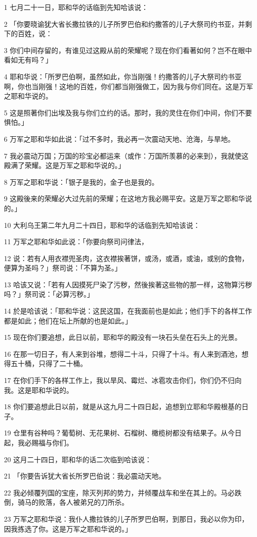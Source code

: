 \par 1 七月二十一日，耶和华的话临到先知哈该说：
\par 2 「你要晓谕犹大省长撒拉铁的儿子所罗巴伯和约撒答的儿子大祭司约书亚，并剩下的百姓，说：
\par 3 你们中间存留的，有谁见过这殿从前的荣耀呢？现在你们看著如何？岂不在眼中看如无有吗？」
\par 4 耶和华说：「所罗巴伯啊，虽然如此，你当刚强！约撒答的儿子大祭司约书亚啊，你也当刚强！这地的百姓，你们都当刚强做工，因为我与你们同在。这是万军之耶和华说的。
\par 5 这是照著你们出埃及我与你们立约的话。那时，我的灵住在你们中间，你们不要惧怕。」
\par 6 万军之耶和华如此说：「过不多时，我必再一次震动天地、沧海，与旱地。
\par 7 我必震动万国；万国的珍宝必都运来（或作：万国所羡慕的必来到），我就使这殿满了荣耀。这是万军之耶和华说的。」
\par 8 万军之耶和华说：「银子是我的，金子也是我的。
\par 9 这殿後来的荣耀必大过先前的荣耀；在这地方我必赐平安。这是万军之耶和华说的。」
\par 10 大利乌王第二年九月二十四日，耶和华的话临到先知哈该说：
\par 11 万军之耶和华如此说：「你要向祭司问律法，
\par 12 说：若有人用衣襟兜圣肉，这衣襟挨著饼，或汤，或酒，或油，或别的食物，便算为圣吗？」祭司说：「不算为圣。」
\par 13 哈该又说：「若有人因摸死尸染了污秽，然後挨著这些物的那一样，这物算污秽吗？」祭司说：「必算污秽。」
\par 14 於是哈该说：「耶和华说：这民这国，在我面前也是如此；他们手下的各样工作都是如此；他们在坛上所献的也是如此。」
\par 15 现在你们要追想，此日以前，耶和华的殿没有一块石头垒在石头上的光景。
\par 16 在那一切日子，有人来到谷堆，想得二十斗，只得了十斗。有人来到酒池，想得五十桶，只得了二十桶。
\par 17 在你们手下的各样工作上，我以旱风、霉烂、冰雹攻击你们，你们仍不归向我。这是耶和华说的。
\par 18 你们要追想此日以前，就是从这九月二十四日起，追想到立耶和华殿根基的日子。
\par 19 仓里有谷种吗？葡萄树、无花果树、石榴树、橄榄树都没有结果子。从今日起，我必赐福与你们。
\par 20 这月二十四日，耶和华的话二次临到哈该说：
\par 21 「你要告诉犹大省长所罗巴伯说：我必震动天地。
\par 22 我必倾覆列国的宝座，除灭列邦的势力，并倾覆战车和坐在其上的。马必跌倒，骑马的败落，各人被弟兄的刀所杀。
\par 23 万军之耶和华说：我仆人撒拉铁的儿子所罗巴伯啊，到那日，我必以你为印，因我拣选了你。这是万军之耶和华说的。」


